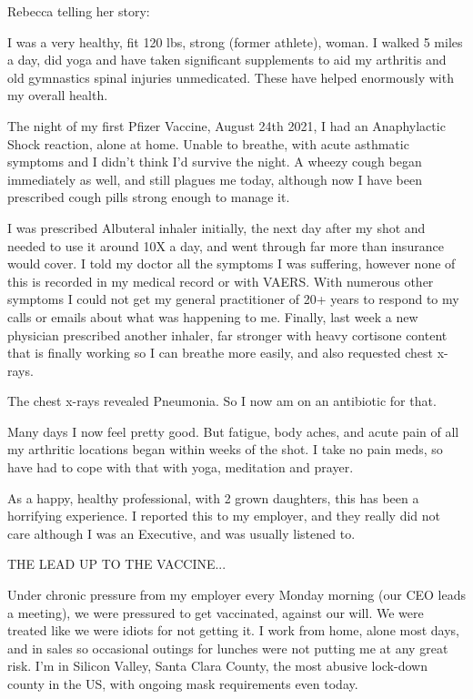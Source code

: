Rebecca telling her story:

I was a very healthy, fit 120 lbs, strong (former athlete), woman. I walked 5
miles a day, did yoga and have taken significant supplements to aid my arthritis
and old gymnastics spinal injuries unmedicated. These have helped enormously
with my overall health.

The night of my first Pfizer Vaccine, August 24th 2021, I had an Anaphylactic
Shock reaction, alone at home. Unable to breathe, with acute asthmatic symptoms
and I didn’t think I’d survive the night. A wheezy cough began immediately as
well, and still plagues me today, although now I have been prescribed cough
pills strong enough to manage it.

I was prescribed Albuteral inhaler initially, the next day after my shot and
needed to use it around 10X a day, and went through far more than insurance
would cover. I told my doctor all the symptoms I was suffering, however none of
this is recorded in my medical record or with VAERS. With numerous other
symptoms I could not get my general practitioner of 20+ years to respond to my
calls or emails about what was happening to me. Finally, last week a new
physician prescribed another inhaler, far stronger with heavy cortisone content
that is finally working so I can breathe more easily, and also requested chest
x-rays.

The chest x-rays revealed Pneumonia. So I now am on an antibiotic for that.

Many days I now feel pretty good. But fatigue, body aches, and acute pain of all
my arthritic locations began within weeks of the shot. I take no pain meds, so
have had to cope with that with yoga, meditation and prayer.

As a happy, healthy professional, with 2 grown daughters, this has been a
horrifying experience. I reported this to my employer, and they really did not
care although I was an Executive, and was usually listened to.

THE LEAD UP TO THE VACCINE...

Under chronic pressure from my employer every Monday morning (our CEO leads a
meeting), we were pressured to get vaccinated, against our will. We were treated
like we were idiots for not getting it. I work from home, alone most days, and
in sales so occasional outings for lunches were not putting me at any great
risk. I’m in Silicon Valley, Santa Clara County, the most abusive lock-down
county in the US, with ongoing mask requirements even today.


